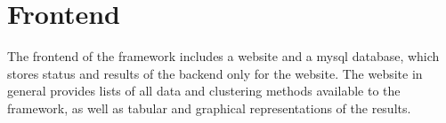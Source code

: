
	\section{Frontend}\label{subsec_general_frontend}
	The frontend of the framework includes a website and a mysql database, which stores status and results of the backend only for the website. The website in general provides lists of all data and clustering methods available to the framework, as well as tabular and graphical representations of the results.
	